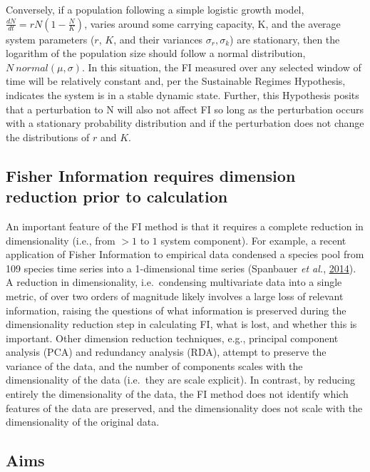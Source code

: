 \documentclass[12pt,twoside,openany]{reedthesis}
\begin{document}
Conversely, if a population following a simple logistic growth model, \(\frac{dN}{dt}=rN(1-\frac{N}{K})\), varies around some carrying capacity, K, and the average system parameters (\(r\), \(K\), and their variances \(\sigma_r, \sigma_k\)) are stationary, then the logarithm of the population size should follow a normal distribution, \(N ~ normal(\mu,\sigma)\). In this situation, the FI measured over any selected window of time will be relatively constant and, per the Sustainable Regimes Hypothesis, indicates the system is in a stable dynamic state. Further, this Hypothesis posits that a perturbation to N will also not affect FI so long as the perturbation occurs with a stationary probability distribution and if the perturbation does not change the distributions of \(r\) and \(K\).

\hypertarget{fisher-information-requires-dimension-reduction-prior-to-calculation}{%
\subsection{Fisher Information requires dimension reduction prior to calculation}\label{fisher-information-requires-dimension-reduction-prior-to-calculation}}

An important feature of the FI method is that it requires a complete reduction in dimensionality (i.e., from \(>1\) to \(1\) system component). For example, a recent application of Fisher Information to empirical data condensed a species pool from 109 species time series into a 1-dimensional time series (Spanbauer \emph{et al.}, \protect\hyperlink{ref-spanbauer_prolonged_2014}{2014}). A reduction in dimensionality, i.e.~condensing multivariate data into a single metric, of over two orders of magnitude likely involves a large loss of relevant information, raising the questions of what information is preserved during the dimensionality reduction step in calculating FI, what is lost, and whether this is important. Other dimension reduction techniques, e.g., principal component analysis (PCA) and redundancy analysis (RDA), attempt to preserve the variance of the data, and the number of components scales with the dimensionality of the data (i.e.~they are scale explicit). In contrast, by reducing entirely the dimensionality of the data, the FI method does not identify which features of the data are preserved, and the dimensionality does not scale with the dimensionality of the original data.

\hypertarget{aims}{%
\subsection{Aims}\label{aims}}
\end{document}
